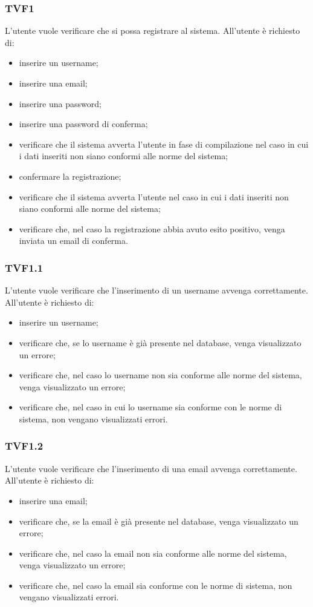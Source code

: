 		\subsubsection{TVF1}
			L'utente vuole verificare che si possa registrare al sistema. All'utente è richiesto di:
			\begin{itemize}
				\item inserire un username;
				\item inserire una email;
				\item inserire una password;
				\item inserire una password di conferma;
				\item verificare che il sistema avverta l'utente in fase di compilazione nel caso in cui i dati inseriti non siano conformi alle norme del sistema;
				\item confermare la registrazione;
				\item verificare che il sistema avverta l'utente nel caso in cui i dati inseriti non siano conformi alle norme del sistema;
				\item verificare che, nel caso la registrazione abbia avuto esito positivo, venga inviata un email di conferma.
			\end{itemize}
			
		\subsubsection{TVF1.1}
			L'utente vuole verificare che l'inserimento di un username avvenga correttamente. All'utente è richiesto di:
			\begin{itemize}
				\item inserire un username;
				\item verificare che, se lo username è già presente nel database, venga visualizzato un errore;
				\item verificare che, nel caso lo username non sia conforme alle norme del sistema, venga visualizzato un errore;
				\item verificare che, nel caso in cui lo username sia conforme con le norme di sistema, non vengano visualizzati errori.
			\end{itemize}
			
		\subsubsection{TVF1.2}
			L'utente vuole verificare che l'inserimento di una email avvenga correttamente. All'utente è richiesto di:
			\begin{itemize}
				\item inserire una email;
				\item verificare che, se la email è già presente nel database, venga visualizzato un errore;
				\item verificare che, nel caso la email non sia conforme alle norme del sistema, venga visualizzato un errore;
				\item verificare che, nel caso la email sia conforme con le norme di sistema, non vengano visualizzati errori.
			\end{itemize}
			
